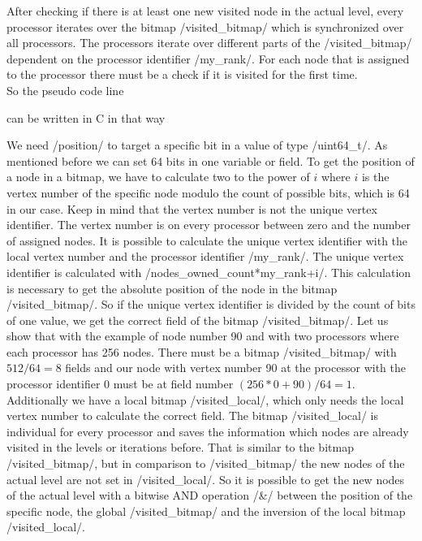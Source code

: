 \documentclass[12pt,a4paper]{article}
\begin{document}
After checking if there is at least one new visited node in the actual level, every processor iterates over the bitmap \cinline/visited_bitmap/ which is synchronized over all processors. The processors iterate over different parts of the \cinline/visited_bitmap/ dependent on the processor identifier \cinline/my_rank/. For each node that is assigned to the processor there must be a check if it is visited for the first time.\\
So the pseudo code line
\begin{ccode}
if (nodes_owned[i] is visited for the first time){
\end{ccode}
can be written in C in that way
\begin{ccode}
position = (uint64_t) pow(2, (i %
if (position & visited_bitmap[((nodes_owned_count*my_rank+i) / 64)] & ~visited_local[(i / 64)]) {
\end{ccode}
We need \cinline/position/ to target a specific bit in a value of type \cinline/uint64_t/. As mentioned before we can set 64 bits in one variable or field. To get the position of a node in a bitmap, we have to calculate two to the power of \(i\) where \(i\) is the vertex number of the specific node modulo the count of possible bits, which is 64 in our case. Keep in mind that the vertex number is not the unique vertex identifier. The vertex number is on every processor between zero and the number of assigned nodes. It is possible to calculate the unique vertex identifier with the local vertex number and the processor identifier \cinline/my_rank/. The unique vertex identifier is calculated with \cinline/nodes_owned_count*my_rank+i/. This calculation is necessary to get the absolute position of the node in the bitmap \cinline/visited_bitmap/. So if the unique vertex identifier is divided by the count of bits of one value, we get the correct field of the bitmap \cinline/visited_bitmap/. Let us show that with the example of node number 90 and with two processors where each processor has 256 nodes. There must be a bitmap \cinline/visited_bitmap/ with \(512/64 = 8\) fields and our node with vertex number 90 at the processor with the processor identifier 0 must be at field number \((256*0+90) / 64 = 1\).\\
Additionally we have a local bitmap \cinline/visited_local/, which only needs the local vertex number to calculate the correct field. The bitmap \cinline/visited_local/ is individual for every processor and saves the information which nodes are already visited in the levels or iterations before. That is similar to the bitmap \cinline/visited_bitmap/, but in comparison to \cinline/visited_bitmap/ the new nodes of the actual level are not set in \cinline/visited_local/. So it is possible to get the new nodes of the actual level with a bitwise AND operation \cinline/&/ between the position of the specific node, the global \cinline/visited_bitmap/ and the inversion of the local bitmap \cinline/visited_local/.\\
\end{document}
